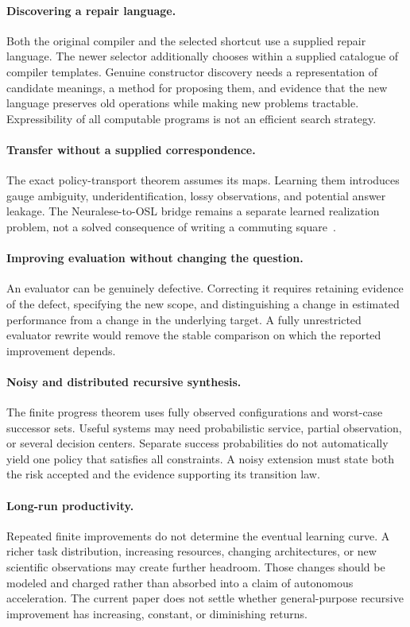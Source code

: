 \documentclass[11pt,letterpaper]{article}
\theoremstyle{plain}
\theoremstyle{definition}
\begin{document}
\paragraph{Discovering a repair language.}
Both the original compiler and the selected shortcut use a supplied repair language. The newer selector additionally chooses within a supplied catalogue of compiler templates. Genuine constructor discovery needs a representation of candidate meanings, a method for proposing them, and evidence that the new language preserves old operations while making new problems tractable. Expressibility of all computable programs is not an efficient search strategy.

\paragraph{Transfer without a supplied correspondence.}
The exact policy-transport theorem assumes its maps. Learning them introduces gauge ambiguity, underidentification, lossy observations, and potential answer leakage. The Neuralese-to-OSL bridge remains a separate learned realization problem, not a solved consequence of writing a commuting square~\cite{neuralese}.

\paragraph{Improving evaluation without changing the question.}
An evaluator can be genuinely defective. Correcting it requires retaining evidence of the defect, specifying the new scope, and distinguishing a change in estimated performance from a change in the underlying target. A fully unrestricted evaluator rewrite would remove the stable comparison on which the reported improvement depends.

\paragraph{Noisy and distributed recursive synthesis.}
The finite progress theorem uses fully observed configurations and worst-case successor sets. Useful systems may need probabilistic service, partial observation, or several decision centers. Separate success probabilities do not automatically yield one policy that satisfies all constraints. A noisy extension must state both the risk accepted and the evidence supporting its transition law.

\paragraph{Long-run productivity.}
Repeated finite improvements do not determine the eventual learning curve. A richer task distribution, increasing resources, changing architectures, or new scientific observations may create further headroom. Those changes should be modeled and charged rather than absorbed into a claim of autonomous acceleration. The current paper does not settle whether general-purpose recursive improvement has increasing, constant, or diminishing returns.
\end{document}
